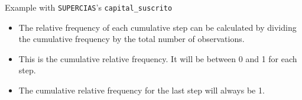 \documentclass[
  10pt,
  ignorenonframetext,
]{beamer}
\begin{document}
\begin{frame}{Example with \texttt{SUPERCIAS}'s
\texttt{capital\_suscrito}}
\label{example-with-superciass-capital_suscrito-2}
\begin{itemize}
\item
  The relative frequency of each cumulative step can be calculated by
  dividing the cumulative frequency by the total number of observations.
\item
  This is the cumulative relative frequency. It will be between 0 and 1
  for each step.
\item
  The cumulative relative frequency for the last step will always be 1.
\end{itemize}
\end{frame}
\end{document}
